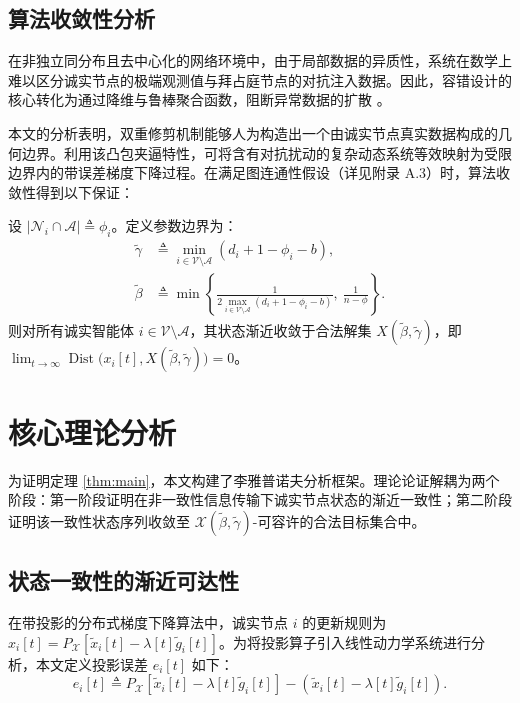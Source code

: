 \subsection{算法收敛性分析}
\quad \quad 在非独立同分布且去中心化的网络环境中，由于局部数据的异质性，系统在数学上难以区分诚实节点的极端观测值与拜占庭节点的对抗注入数据。因此，容错设计的核心转化为通过降维与鲁棒聚合函数，阻断异常数据的扩散 \cite{sundaram2019distributed}。

本文的分析表明，双重修剪机制能够人为构造出一个由诚实节点真实数据构成的几何边界。利用该凸包夹逼特性，可将含有对抗扰动的复杂动态系统等效映射为受限边界内的带误差梯度下降过程。在满足图连通性假设（详见附录 A.3）时，算法收敛性得到以下保证：

\begin{theorem}
    设 $|\mathcal{N}_i\cap\mathcal{A}| \triangleq \phi_i$。定义参数边界为：
    \begin{align}
        \tilde{\gamma} &\triangleq \min_{i \in \mathcal{V} \setminus \mathcal{A}} (d_i + 1 - \phi_i - b), \\
        \tilde{\beta}  &\triangleq \min\left\{\frac{1}{2\max_{i \in \mathcal{V} \setminus \mathcal{A}}(d_i + 1 - \phi_i - b)},\ \frac{1}{n - \phi}\right\}.
    \end{align}
    则对所有诚实智能体 $i\in\mathcal{V}\setminus\mathcal{A}$，其状态渐近收敛于合法解集 $X(\widetilde{\beta}, \widetilde{\gamma})$，即 \\ 
    $\lim_{t\to\infty} \operatorname{Dist}\bigl(x_i[t], X(\widetilde{\beta}, \widetilde{\gamma})\bigr) = 0$。
    \label{thm:main}
\end{theorem}

\section{核心理论分析}

\quad \quad  为证明定理 \ref{thm:main}，本文构建了李雅普诺夫分析框架。理论论证解耦为两个阶段：第一阶段证明在非一致性信息传输下诚实节点状态的渐近一致性；第二阶段证明该一致性状态序列收敛至 $\mathcal{X}(\tilde{\beta}, \tilde{\gamma})$-可容许的合法目标集合中。

\subsection{状态一致性的渐近可达性}
\quad \quad  在带投影的分布式梯度下降算法中，诚实节点 $i$ 的更新规则为 $x_i[t] = P_{\mathcal{X}} [\tilde{x}_i[t] - \lambda[t]\tilde{g}_i[t]]$。为将投影算子引入线性动力学系统进行分析，本文定义投影误差 $e_i[t]$ 如下：
\begin{equation} \label{eq:proj_err}
    e_i[t] \triangleq P_{\mathcal{X}} [\tilde{x}_i[t] - \lambda[t]\tilde{g}_i[t]] - (\tilde{x}_i[t] - \lambda[t]\tilde{g}_i[t]).
\end{equation}


